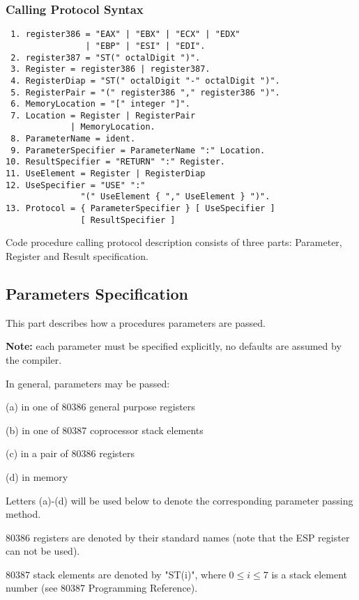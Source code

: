 \subsubsection{Calling Protocol Syntax}

\begin{verbatim}
 1. register386 = "EAX" | "EBX" | "ECX" | "EDX"
                | "EBP" | "ESI" | "EDI".
 2. register387 = "ST(" octalDigit ")".
 3. Register = register386 | register387.
 4. RegisterDiap = "ST(" octalDigit "-" octalDigit ")".
 5. RegisterPair = "(" register386 "," register386 ")".
 6. MemoryLocation = "[" integer "]".
 7. Location = Register | RegisterPair
             | MemoryLocation.
 8. ParameterName = ident.
 9. ParameterSpecifier = ParameterName ":" Location.
10. ResultSpecifier = "RETURN" ":" Register.
11. UseElement = Register | RegisterDiap
12. UseSpecifier = "USE" ":"
               "(" UseElement { "," UseElement } ")".
13. Protocol = { ParameterSpecifier } [ UseSpecifier ]
               [ ResultSpecifier ]
\end{verbatim}

Code procedure calling protocol description consists of three parts:
Parameter, Register and Result specification.

\subsection{Parameters Specification}

This part describes how a procedures parameters are passed.

{\bf Note:} each parameter must be specified explicitly, no defaults are
assumed by the compiler.

In general, parameters may be passed:
\begin{description}
\item (a) in one of 80386 general purpose registers
\item (b) in one of 80387 coprocessor stack elements
\item (c) in a pair of 80386 registers
\item (d) in memory
\end{description}

   Letters (a)-(d) will be used below to denote the corresponding parameter
   passing method.

   80386 registers are denoted by their standard names
   (note that the ESP register can not be used).

   80387 stack elements are denoted by "ST(i)", where $0\leq i\leq 7$ is
   a stack element number (see 80387 Programming Reference).

